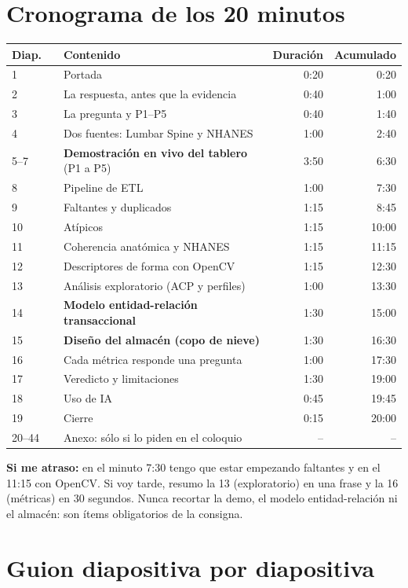 \documentclass[11pt,a4paper]{article}
\begin{document}
\section*{Cronograma de los 20 minutos}
\renewcommand{\arraystretch}{1.2}
\begin{tabularx}{\linewidth}{@{}llXrr@{}}
\toprule
Diap. & & Contenido & Duración & Acumulado \\ \midrule
1 & & Portada & 0:20 & 0:20 \\
2 & & La respuesta, antes que la evidencia & 0:40 & 1:00 \\
3 & & La pregunta y P1--P5 & 0:40 & 1:40 \\
4 & & Dos fuentes: Lumbar Spine y NHANES & 1:00 & 2:40 \\
5--7 & & \textbf{Demostración en vivo del tablero} (P1 a P5) & 3:50 & 6:30 \\
8 & & Pipeline de ETL & 1:00 & 7:30 \\
9 & & Faltantes y duplicados & 1:15 & 8:45 \\
10 & & Atípicos & 1:15 & 10:00 \\
11 & & Coherencia anatómica y NHANES & 1:15 & 11:15 \\
12 & & Descriptores de forma con OpenCV & 1:15 & 12:30 \\
13 & & Análisis exploratorio (ACP y perfiles) & 1:00 & 13:30 \\
14 & & \textbf{Modelo entidad-relación transaccional} & 1:30 & 15:00 \\
15 & & \textbf{Diseño del almacén (copo de nieve)} & 1:30 & 16:30 \\
16 & & Cada métrica responde una pregunta & 1:00 & 17:30 \\
17 & & Veredicto y limitaciones & 1:30 & 19:00 \\
18 & & Uso de IA & 0:45 & 19:45 \\
19 & & Cierre & 0:15 & 20:00 \\
20--44 & & Anexo: sólo si lo piden en el coloquio & -- & -- \\ \bottomrule
\end{tabularx}

\textbf{Si me atraso:} en el minuto 7:30 tengo que estar empezando faltantes y en el 11:15 con OpenCV. Si voy tarde, resumo la 13 (exploratorio) en una frase y la 16 (métricas) en 30 segundos. Nunca recortar la demo, el modelo entidad-relación ni el almacén: son ítems obligatorios de la consigna.

\section*{Guion diapositiva por diapositiva}
\end{document}
